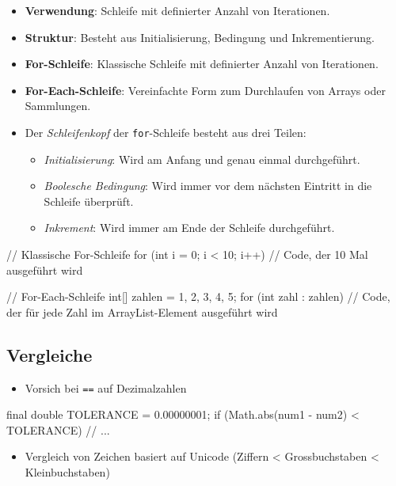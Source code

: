\documentclass[a4paper,10pt, dvipsnames]{report}
\newcommand{\javaInLine}[1]{\texttt{#1}}
\begin{document}
\begin{itemize}
    \item \textbf{Verwendung}: Schleife mit definierter Anzahl von Iterationen.
    \item \textbf{Struktur}: Besteht aus Initialisierung, Bedingung und Inkrementierung.
    \item \textbf{For-Schleife}: Klassische Schleife mit definierter Anzahl von Iterationen.
    \item \textbf{For-Each-Schleife}: Vereinfachte Form zum Durchlaufen von Arrays oder Sammlungen.
    \item Der \textit{Schleifenkopf} der \javaInLine{for}-Schleife besteht aus drei Teilen:
    \begin{itemize}
        \item \textit{Initialisierung}: Wird am Anfang und genau einmal durchgeführt.
        \item \textit{Boolesche Bedingung}: Wird immer vor dem nächsten Eintritt in die Schleife überprüft.
        \item \textit{Inkrement}: Wird immer am Ende der Schleife durchgeführt.
    \end{itemize}
\end{itemize}

\begin{javacodebox}
    // Klassische For-Schleife
    for (int i = 0; i < 10; i++) {
        // Code, der 10 Mal ausgeführt wird
    }

    // For-Each-Schleife
    int[] zahlen = {1, 2, 3, 4, 5};
    for (int zahl : zahlen) {
        // Code, der für jede Zahl im ArrayList-Element ausgeführt wird
    }
\end{javacodebox}

\subsection{Vergleiche}

\begin{itemize}
    \item Vorsich bei \javaInLine{==} auf Dezimalzahlen
\end{itemize}

\begin{javacodebox}
    final double TOLERANCE = 0.00000001;
    if (Math.abs(num1 - num2) < TOLERANCE) {
        // ...
    }
\end{javacodebox}

\begin{itemize}
    \item Vergleich von Zeichen basiert auf Unicode (Ziffern < Grossbuchstaben < Kleinbuchstaben)
\end{itemize}
\end{document}
